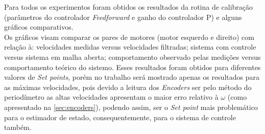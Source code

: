 Para todos os experimentos foram obtidos os resultados da rotina de calibração (parâmetros do controlador \emph{Feedforward} e ganho do controlador P) e alguns gráficos comparativos. \\

Os gráficos visam comparar os pares de motores (motor esquerdo e direito) com relação à: velocidades medidas versus velocidades filtradas; sistema com controle versus sistema em malha aberta; comportamento observado pelas medições versus comportamento teórico do sistemo. Esses resultados foram obtidos para diferentes valores de \emph{Set points}, porém no trabalho será mostrado apenas os resultados para as máximas velocidades, pois devido a leitura dos \emph{Encoders} ser pelo método do periodímetro as altas velocidades apresentam o maior erro relativo à $\omega$ (como apresentado na \autoref{sec:encoders}), podendo assim, ser o \emph{Set point} mais problemático para o estimador de estado, consequentemente, para o sistema de controle também.\\



